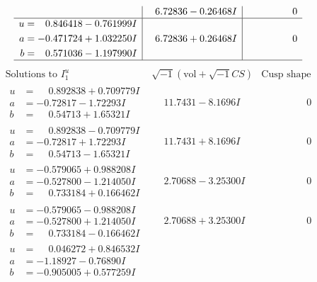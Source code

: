 \documentclass[1p]{elsarticle_modified}
\theoremstyle{definition}
\newcommand{\I}{\sqrt{-1}}
\begin{document}
$$\begin{array}{c|c|c}
 & \phantom{-}6.72836 - 0.26468 I & \phantom{-0.000000 } 0 \\ \hline\begin{aligned}
u &= \phantom{-}0.846418 - 0.761999 I \\
a &= -0.471724 + 1.032250 I \\
b &= \phantom{-}0.571036 - 1.197990 I\end{aligned}
 & \phantom{-}6.72836 + 0.26468 I & \phantom{-0.000000 } 0\\
 \hline 
 \end{array}$$\newpage$$\begin{array}{c|c|c}  
\text{Solutions to }I^u_{1}& \I (\text{vol} + \sqrt{-1}CS) & \text{Cusp shape}\\
 \hline 
\begin{aligned}
u &= \phantom{-}0.892838 + 0.709779 I \\
a &= -0.72817 - 1.72293 I \\
b &= \phantom{-}0.54713 + 1.65321 I\end{aligned}
 & \phantom{-}11.7431 - 8.1696 I & \phantom{-0.000000 } 0 \\ \hline\begin{aligned}
u &= \phantom{-}0.892838 - 0.709779 I \\
a &= -0.72817 + 1.72293 I \\
b &= \phantom{-}0.54713 - 1.65321 I\end{aligned}
 & \phantom{-}11.7431 + 8.1696 I & \phantom{-0.000000 } 0 \\ \hline\begin{aligned}
u &= -0.579065 + 0.988208 I \\
a &= -0.527800 - 1.214050 I \\
b &= \phantom{-}0.733184 + 0.166462 I\end{aligned}
 & \phantom{-}2.70688 - 3.25300 I & \phantom{-0.000000 } 0 \\ \hline\begin{aligned}
u &= -0.579065 - 0.988208 I \\
a &= -0.527800 + 1.214050 I \\
b &= \phantom{-}0.733184 - 0.166462 I\end{aligned}
 & \phantom{-}2.70688 + 3.25300 I & \phantom{-0.000000 } 0 \\ \hline\begin{aligned}
u &= \phantom{-}0.046272 + 0.846532 I \\
a &= -1.18927 - 0.76890 I \\
b &= -0.905005 + 0.577259 I\end{aligned}

\end{array}$$
\end{document}
